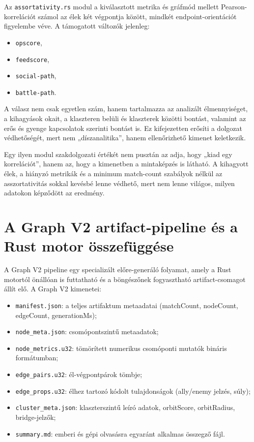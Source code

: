 ﻿\documentclass[a4paper,12pt]{report}
\begin{document}
Az \texttt{assortativity.rs} modul a kiválasztott metrika és gráfmód mellett Pearson-korrelációt számol az élek két végpontja között, mindkét endpoint-orientációt figyelembe véve. A támogatott változók jelenleg:

\begin{itemize}
    \item \texttt{opscore},
    \item \texttt{feedscore},
    \item \texttt{social-path},
    \item \texttt{battle-path}.
\end{itemize}

A válasz nem csak egyetlen szám, hanem tartalmazza az analizált élmennyiséget, a kihagyások okait, a klaszteren belüli és klaszterek közötti bontást, valamint az erős és gyenge kapcsolatok szerinti bontást is. Ez kifejezetten erősíti a dolgozat védhetőségét, mert nem „díszanalitika”, hanem ellenőrizhető kimenet keletkezik.

Egy ilyen modul szakdolgozati értékét nem pusztán az adja, hogy „kiad egy korrelációt”, hanem az, hogy a kimenetben a mintaképzés is látható. A kihagyott élek, a hiányzó metrikák és a minimum match-count szabályok nélkül az asszortativitás sokkal kevésbé lenne védhető, mert nem lenne világos, milyen adatokon képződött az eredmény.

\section{A Graph V2 artifact-pipeline és a Rust motor összefüggése}

A Graph V2 pipeline egy specializált előre-generáló folyamat, amely a Rust motortól önállóan is futtatható és a böngészőnek fogyasztható artifact-csomagot állít elő. A Graph V2 kimenetei:

\begin{itemize}
    \item \texttt{manifest.json}: a teljes artifaktum metaadatai (matchCount, nodeCount, edgeCount, generationMs);
    \item \texttt{node\_meta.json}: csomópontszintű metaadatok;
    \item \texttt{node\_metrics.u32}: tömörített numerikus csomóponti mutatók bináris formátumban;
    \item \texttt{edge\_pairs.u32}: él-végpontpárok tömbje;
    \item \texttt{edge\_props.u32}: élhez tartozó kódolt tulajdonságok (ally/enemy jelzés, súly);
    \item \texttt{cluster\_meta.json}: klaszterszintű leíró adatok, orbitScore, orbitRadius, bridge-jelzők;
    \item \texttt{summary.md}: emberi és gépi olvasásra egyaránt alkalmas összegző fájl.
\end{itemize}
\end{document}

